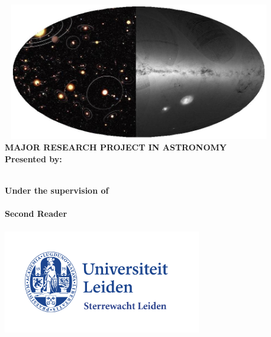 \begin{titlepage}
\begin{addmargin}[-1cm]{-3cm}
\begin{center}
        \includegraphics[width=12cm,height=6cm]{gfx/EXO_3.jpg} \\       
        
		\vspace{1cm}
		\medskip
		\small \textbf{MAJOR RESEARCH PROJECT IN ASTRONOMY}\\
		\vspace{1.0cm}
		\textbf{Presented by:}\\
        \spacedlowsmallcaps{\myName}
      

		
		\vspace{1cm}
        \myDegree \\
        

        \vspace{1cm}
         \textbf{Under the supervision of}\\ \medskip
        \myProf\\ \medskip
         \textbf{Second Reader}\\ \medskip
        \myOtherProf\\
        
        \vfill
        \includegraphics[width=0.65\textwidth]{gfx/Logo_Leiden.png} \\ \bigskip 
        \vspace{0.05cm}
        \myDepartment \\                            
        \myFaculty \\
        \myTime


        \vfill                      

    \end{center}  
  \end{addmargin}       
\end{titlepage}   
